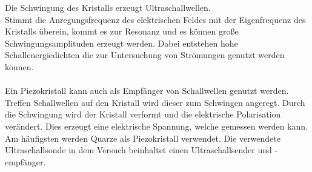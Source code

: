 Die Schwingung des Kristalls erzeugt Ultraschallwellen.\\
Stimmt die Anregungsfrequenz des elektrischen Feldes mit der Eigenfrequenz des Kristalls überein, kommt es zur Resonanz und es können große Schwingungsamplituden erzeugt werden.
Dabei entstehen hohe Schallenergiedichten die zur Untersuchung von Strömungen genutzt werden können.
\\
\\
Ein Piezokristall kann auch als Empfänger von Schallwellen genutzt werden.
Treffen Schallwellen auf den Kristall wird dieser zum Schwingen angeregt.
Durch die Schwingung wird der Kristall verformt und die elektrische Polarisation verändert.
Dies erzeugt eine elektrische Spannung, welche gemessen werden kann.\\
Am häufigsten werden Quarze als Piezokristall verwendet.
Die verwendete Ultraschallsonde in dem Versuch beinhaltet einen Ultraschallsender und -empfänger.
